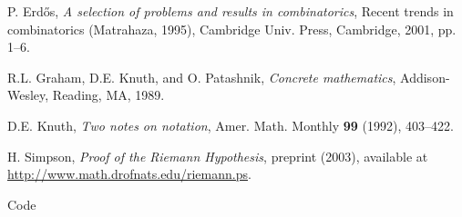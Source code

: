 \documentclass[11pt,a4paper,twoside,openright]{scrbook}
\begin{document}
\begin{thebibliography}{9}
 P. Erd\H os, \emph{A selection of problems and
results in combinatorics}, Recent trends in combinatorics (Matrahaza,
1995), Cambridge Univ. Press, Cambridge, 2001, pp. 1--6.

R.L. Graham, D.E. Knuth, and O. Patashnik, \emph{Concrete
mathematics}, Addison-Wesley, Reading, MA, 1989.

 D.E. Knuth, \emph{Two notes on notation}, Amer.
Math. Monthly \textbf{99} (1992), 403--422.

 H. Simpson, \emph{Proof of the Riemann
Hypothesis},  preprint (2003), available at
\url{http://www.math.drofnats.edu/riemann.ps}.
\end{thebibliography}
\newpage

\listoffigures
\newpage

\listoftables
\newpage

Code
\end{document}
